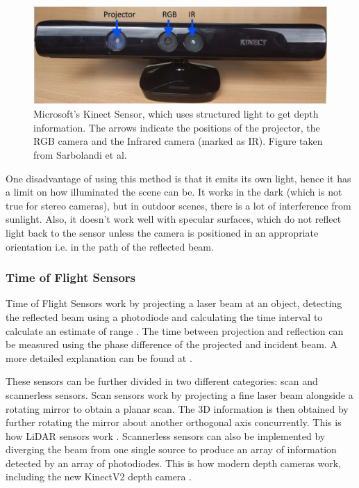 \documentclass[11pt]{article}
\begin{document}
\begin{figure}
	\begin{minipage}{0.65\textwidth}
		\centering
		\includegraphics[width=\textwidth]{Kinectv1}
	\end{minipage} \hfill
	\begin{minipage}{0.35\textwidth}
		\centering
		\caption{Microsoft's Kinect Sensor, which uses structured light to get depth information. The arrows indicate the positions of the projector, the RGB camera and the Infrared camera (marked as IR). Figure taken from Sarbolandi et al. \cite{sarbolandi2015kinect}}
		\label{fig:KinectSensor}
	\end{minipage}				
\end{figure}

One disadvantage of using this method is that it emits its own light, hence it has a limit on how illuminated the scene can be. It works in the dark (which is not true for stereo cameras), but in outdoor scenes, there is a lot of interference from sunlight. Also, it doesn't work well with specular surfaces, which do not reflect light back to the sensor unless the camera is positioned in an appropriate orientation i.e. in the path of the reflected beam.
	
	\subsubsection{Time of Flight Sensors}

Time of Flight Sensors work by projecting a laser beam at an object, detecting the reflected beam using a photodiode and calculating the time interval to calculate an estimate of range \cite{horaud2016overview}. The time between projection and reflection can be measured using the phase difference of the projected and incident beam. A more detailed explanation can be found at \cite{horaud2016overview}.

These sensors can be further divided in two different categories: scan and scannerless sensors. Scan sensors work by projecting a fine laser beam alongside a rotating mirror to obtain a planar scan. The 3D information is then obtained by further rotating the mirror about another orthogonal axis concurrently. This is how LiDAR sensors work \cite{horaud2016overview}. Scannerless sensors can also be implemented by diverging the beam from one single source to produce an array of information detected by an array of photodiodes. This is how modern depth cameras work, including the new KinectV2 depth camera \cite{wasenmuller2016comparison}.
\end{document}
